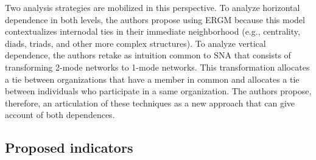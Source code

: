 \documentclass[a4paper, 12pt, openright, oneside, german, french, brazil, english, article]{abntex2}
\begin{document}
	Two analysis strategies are mobilized in this perspective. To analyze horizontal dependence in both levels, the authors propose using ERGM because this model contextualizes internodal ties in their immediate neighborhood (e.g., centrality, diads, triads, and other more complex structures). To analyze vertical dependence, the authors retake as intuition common to SNA that consists of transforming 2-mode networks to 1-mode networks. This transformation allocates a tie between organizations that have a member in common and allocates a tie between individuals who participate in a same organization. The authors propose, therefore, an articulation of these techniques as a new approach that can give account of both dependences.
	
	
	\subsection{Proposed indicators}
	
	
\end{document}
